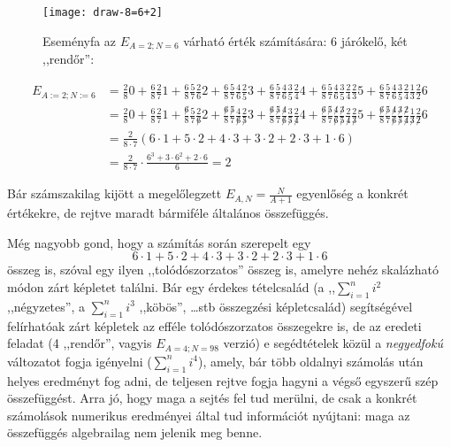 \documentclass{article}
\newcommand{\parenthesed}[1]{\left(#1\right)}
\begin{document}
	\begin{figure}[H]
		\caption*{Eseményfa az $E_{A=2;N=6}$ várható érték számítására: 6 járókelő, két ,,rendőr'':}
		\centering
		\texttt{[image: draw-8=6+2]}
	\end{figure}

	\begin{align*}
		E_{A:=2; N:=6} &= \frac{2}{8}0 + \frac{6}{8}\frac{2}{7}1 + \frac{6}{8}\frac{5}{7}\frac{2}{6}2 + \frac{6}{8}\frac{5}{7}\frac{4}{6}\frac{2}{5}3 + \frac{6}{8}\frac{5}{7}\frac{4}{6}\frac{3}{5}\frac{2}{4}4 + \frac{6}{8}\frac{5}{7}\frac{4}{6}\frac{3}{5}\frac{2}{4}\frac{2}{3}5 + \frac{6}{8}\frac{5}{7}\frac{4}{6}\frac{3}{5}\frac{2}{4}\frac{1}{3}\frac{2}{2}6\\
		  &= \frac{2}{8}0 + \frac{6}{8}\frac{2}{7}1 + \frac{\not6}{8}\frac{5}{7}\frac{2}{\not6}2 + \frac{\not6}{8}\frac{\not5}{7}\frac{4}{\not6}\frac{2}{\not5}3 + \frac{\not6}{8}\frac{\not5}{7}\frac{\not4}{\not6}\frac{3}{\not5}\frac{2}{\not4}4 + \frac{\not6}{8}\frac{\not5}{7}\frac{\not4}{\not6}\frac{\not3}{\not5}\frac{2}{\not4}\frac{2}{\not3}5 + \frac{\not6}{8}\frac{\not5}{7}\frac{\not4}{\not6}\frac{\not3}{\not5}\frac{\not2}{\not4}\frac{1}{\not3}\frac{2}{\not2}6\\
		  &= \frac2{8\cdot7}\parenthesed{6\cdot1 + 5\cdot2 + 4\cdot3 + 3\cdot2 + 2\cdot3 + 1\cdot6}\\
		  &= \frac2{8\cdot7}\cdot\frac{6^3+3\cdot6^2+2\cdot6}6 = 2
	\end{align*}

	Bár számszakilag kijött a megelőlegzett $E_{A,N} = \frac N{A+1}$ egyenlőség a konkrét értékekre, de rejtve maradt bármiféle általános összefüggés.

	Még nagyobb gond, hogy a számítás során szerepelt egy \[6\cdot1 + 5\cdot2 + 4\cdot3 + 3\cdot2 + 2\cdot3 + 1\cdot6\] összeg is, szóval egy ilyen ,,tolódószorzatos'' összeg is, amelyre nehéz skalázható módon zárt képletet találni.
	Bár egy érdekes tételcsalád (a ,,$\sum_{i=1}^n i^2$  ,,négyzetes'', a $\sum_{i=1}^n i^3$ ,,köbös'', \dots stb összegzési képletcsalád) segítségével felírhatóak zárt képletek az efféle tolódószorzatos összegekre is,
	de az eredeti feladat (4 ,,rendőr'', vagyis $E_{A=4;N=98}$ verzió) e segédtételek közül a \emph{negyedfokú} változatot fogja igényelni ($\sum_{i=1}^n i^4$), amely, bár több oldalnyi számolás után helyes eredményt fog adni, de teljesen rejtve fogja hagyni a végső egyszerű szép összefüggést. Arra jó, hogy maga a sejtés fel tud merülni, de csak a konkrét számolások numerikus eredményei által tud információt nyújtani: maga az összefüggés algebrailag nem jelenik meg benne. 
\end{document}
